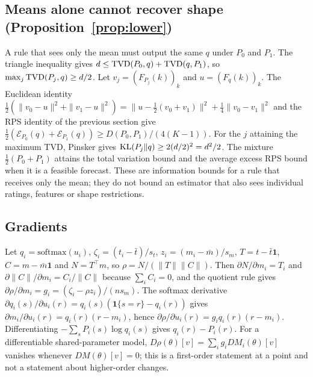 \subsection{Means alone cannot recover shape (Proposition~\ref{prop:lower})}
A rule that sees only the mean must output the same $q$ under $P_0$ and $P_1$.
The triangle inequality gives $d\le\mathrm{TVD}(P_0,q)+\mathrm{TVD}(q,P_1)$, so $\max_j\mathrm{TVD}(P_j,q)\ge d/2$.
Let $v_j=(F_{P_j}(k))_k$ and $u=(F_q(k))_k$.
The Euclidean identity $\tfrac12(\|v_0-u\|^2+\|v_1-u\|^2)=\|u-\tfrac12(v_0+v_1)\|^2+\tfrac14\|v_0-v_1\|^2$ and the RPS identity of the previous section give $\tfrac12(\mathcal E_{P_0}(q)+\mathcal E_{P_1}(q))\ge D(P_0,P_1)/(4(K-1))$.
For the $j$ attaining the maximum TVD, Pinsker gives $\mathrm{KL}(P_j\|q)\ge2(d/2)^2=d^2/2$.
The mixture $\tfrac12(P_0+P_1)$ attains the total variation bound and the average excess RPS bound when it is a feasible forecast.
These are information bounds for a rule that receives only the mean; they do not bound an estimator that also sees individual ratings, features or shape restrictions.

\subsection{Gradients}
Let $q_i=\mathrm{softmax}(u_i)$, $\zeta_i=(t_i-\bar t)/s_t$, $z_i=(m_i-\bar m)/s_m$, $T=t-\bar t\mathbf 1$, $C=m-\bar m\mathbf 1$ and $N=T^\top m$, so $\rho=N/(\|T\|\|C\|)$.
Then $\partial N/\partial m_i=T_i$ and $\partial\|C\|/\partial m_i=C_i/\|C\|$ because $\sum_iC_i=0$, and the quotient rule gives $\partial\rho/\partial m_i=g_i=(\zeta_i-\rho z_i)/(ns_m)$.
The softmax derivative $\partial q_i(s)/\partial u_i(r)=q_i(s)(\mathbf 1\{s=r\}-q_i(r))$ gives $\partial m_i/\partial u_i(r)=q_i(r)(r-m_i)$, hence $\partial\rho/\partial u_i(r)=g_iq_i(r)(r-m_i)$.
Differentiating $-\sum_sP_i(s)\log q_i(s)$ gives $q_i(r)-P_i(r)$.
For a differentiable shared-parameter model, $D\rho(\theta)[v]=\sum_ig_iDM_i(\theta)[v]$ vanishes whenever $DM(\theta)[v]=0$; this is a first-order statement at a point and not a statement about higher-order changes.

